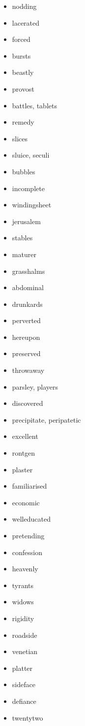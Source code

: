\documentclass{article}
\begin{document}
\begin{itemize}
    \item nodding
    \item lacerated
    \item forced
    \item bursts
    \item beastly
    \item provost
    \item battles, tablets
    \item remedy
    \item slices
    \item sluice, seculi
    \item bubbles
    \item incomplete
    \item windingsheet
    \item jerusalem
    \item stables
    \item maturer
    \item grasshalms
    \item abdominal
    \item drunkards
    \item perverted
    \item hereupon
    \item preserved
    \item throwaway
    \item parsley, players
    \item discovered
    \item precipitate, peripatetic
    \item excellent
    \item rontgen
    \item plaster
    \item familiarised
    \item economic
    \item welleducated
    \item pretending
    \item confession
    \item heavenly
    \item tyrants
    \item widows
    \item rigidity
    \item roadside
    \item venetian
    \item platter
    \item sideface
    \item defiance
    \item twentytwo

\end{itemize}
\end{document}
